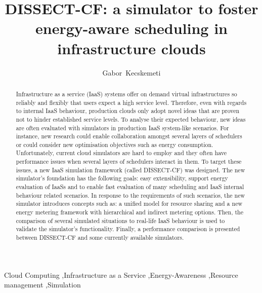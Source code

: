 \documentclass[sort, compress, 5p]{elsarticle}
\newcommand{\mytitle}{DISSECT-CF: a simulator to foster energy-aware scheduling in infrastructure clouds}
\begin{document}
\begin{frontmatter}

\title{\mytitle}
\author[sztaki,uibk,iit]{Gabor~Kecskemeti}

\address[sztaki]{Laboratory of Parallel and Distributed Systems of the Institute for Computer Science and Control of the Hungarian Academy of Sciences~(MTA SZTAKI), Kende u. 13-17, Budapest 1111, Hungary}
\address[uibk]{Distributed and Parallel Systems Group of the Institute of Computer Science at the University of Innsbruck, Technikerstra{\ss}e 21a, Innsbruck 6020, Austria}
\address[iit]{Institute of Informatics at the University of Miskolc, Miskolc-Egyetemvaros 3515, Hungary}

\begin{abstract}
Infrastructure as a service (IaaS) systems offer on demand virtual infrastructures so reliably and flexibly that users expect a high service level. Therefore, even with regards to internal IaaS behaviour, production clouds only adopt novel ideas that are proven not to hinder established service levels. To analyse their expected behaviour, new ideas are often evaluated with simulators in production IaaS system-like scenarios. For instance, new research could enable collaboration amongst several layers of schedulers or could consider new optimisation objectives such as energy consumption. Unfortunately, current cloud simulators are hard to employ and they often have performance issues when several layers of schedulers interact in them. To target these issues, a new IaaS simulation framework (called DISSECT-CF) was designed. The new simulator's foundation has the following goals: easy extensibility, support energy evaluation of IaaSs and to enable fast evaluation of many scheduling and IaaS internal behaviour related scenarios. In response to the requirements of such scenarios, the new simulator introduces concepts such as: a unified model for resource sharing and a new energy metering framework with hierarchical and indirect metering options. Then, the comparison of several simulated situations to real-life IaaS behaviour is used to validate the simulator's functionality. Finally, a performance comparison is presented between DISSECT-CF and some currently available simulators.
\end{abstract}

\begin{keyword}Cloud Computing \sep Infrastructure as a Service \sep Energy-Awareness \sep Resource management \sep Simulation\end{keyword}


\end{frontmatter}
\end{document}
